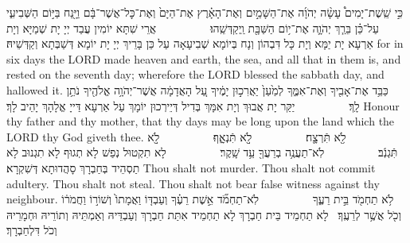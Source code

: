 {%
{כִּ֣י שֵֽׁשֶׁת־יָמִים֩ עָשָׂ֨ה יְהֹוָ֜ה אֶת־הַשָּׁמַ֣יִם וְאֶת־הָאָ֗רֶץ אֶת־הַיָּם֙ וְאֶת־כׇּל־אֲשֶׁר־בָּ֔ם וַיָּ֖נַח בַּיּ֣וֹם הַשְּׁבִיעִ֑י עַל־כֵּ֗ן בֵּרַ֧ךְ יְהֹוָ֛ה אֶת־י֥וֹם הַשַּׁבָּ֖ת וַֽיְקַדְּשֵֽׁהוּ׃ \setuma         
}
{אֲרֵי שִׁתָּא יוֹמִין עֲבַד יְיָ יָת שְׁמַיָּא וְיָת אַרְעָא יָת יַמָּא וְיָת כָּל דִּבְהוֹן וְנָח בְּיוֹמָא שְׁבִיעָאָה עַל כֵּן בָּרֵיךְ יְיָ יָת יוֹמָא דְּשַׁבְּתָא וְקַדְּשֵׁיהּ׃}
{for in six days the LORD made heaven and earth, the sea, and all that in them is, and rested on the seventh day; wherefore the LORD blessed the sabbath day, and hallowed it.}{}
{כַּבֵּ֥ד אֶת־אָבִ֖יךָ וְאֶת־אִמֶּ֑ךָ לְמַ֙עַן֙ יַאֲרִכ֣וּן יָמֶ֔יךָ עַ֚ל הָאֲדָמָ֔ה אֲשֶׁר־יְהֹוָ֥ה אֱלֹהֶ֖יךָ נֹתֵ֥ן לָֽךְ׃ \setuma         
}
{יַקַּר יָת אֲבוּךְ וְיָת אִמָּךְ בְּדִיל דְּיֵירְכוּן יוֹמָךְ עַל אַרְעָא דַּייָ אֱלָהָךְ יָהֵיב לָךְ׃}
{Honour thy father and thy mother, that thy days may be long upon the land which the LORD thy God giveth thee.}{}
{לֹ֥֖א תִּֿרְצָ֖͏ֽח׃ \setuma          לֹ֣֖א תִּֿנְאָ֑͏ֽף׃ \setuma          לֹ֣֖א תִּֿגְנֹֽ֔ב׃ \setuma          לֹֽא־תַעֲנֶ֥ה בְרֵעֲךָ֖ עֵ֥ד שָֽׁקֶר׃ \setuma         
}
{לָא תִקְטוּל נְפַשׁ לָא תְגוּף לָא תִגְנוּב לָא תַסְהֵיד בְּחַבְרָךְ סָהֲדוּתָא דְּשִׁקְרָא׃}
{Thou shalt not murder. Thou shalt not commit adultery. Thou shalt not steal. Thou shalt not bear false witness against thy neighbour.}{}
{לֹ֥א תַחְמֹ֖ד בֵּ֣ית רֵעֶ֑ךָ \setuma          לֹֽא־תַחְמֹ֞ד אֵ֣שֶׁת רֵעֶ֗ךָ וְעַבְדּ֤וֹ וַאֲמָתוֹ֙ וְשׁוֹר֣וֹ וַחֲמֹר֔וֹ וְכֹ֖ל אֲשֶׁ֥ר לְרֵעֶֽךָ׃ \petucha }
{לָא תַחְמֵיד בֵּית חַבְרָךְ לָא תַחְמֵיד אִתַּת חַבְרָךְ וְעַבְדֵּיהּ וְאַמְתֵּיהּ וְתוֹרֵיהּ וּחְמָרֵיהּ וְכֹל דִּלְחַבְרָךְ׃}
}
